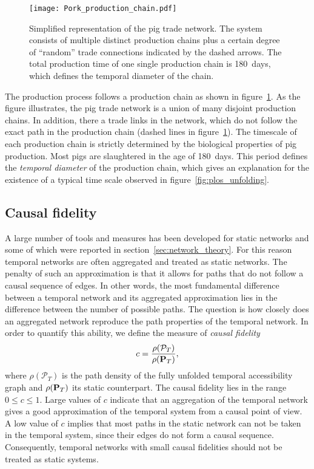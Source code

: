 %
\begin{figure}[htb]
\begin{center}
\texttt{[image: Pork\_production\_chain.pdf]}
\caption{Simplified representation of the pig trade network.
The system consists of multiple distinct production chains plus a certain degree of ``random'' trade connections indicated by the dashed arrows.
The total production time of one single production chain is 180~days, which defines the temporal diameter of the chain.}
\label{fig:pork_production_chain}
\end{center}
\end{figure}
%
The production process follows a production chain as shown in figure~\ref{fig:pork_production_chain}.
As the figure illustrates, the pig trade network is a union of many disjoint production chains.
In addition, there a trade links in the network, which do not follow the exact path in the production chain (dashed lines in figure~\ref{fig:pork_production_chain}).
The timescale of each production chain is strictly determined by the biological properties of pig production.
Most pigs are slaughtered in the age of 180~days.
This period defines the \emph{temporal diameter} of the production chain, which gives an explanation for the existence of a typical time scale observed in figure~\ref{fig:plos_unfolding}.

\subsection{Causal fidelity}\label{sec:causal_fidelity}
A large number of tools and measures has been developed for static networks and some of which were reported in section~\ref{sec:network_theory}.
For this reason temporal networks are often aggregated and treated as static networks.
The penalty of such an approximation is that it allows for paths that do not follow a causal sequence of edges.
In other words, the most fundamental difference between a temporal network and its aggregated approximation lies in the difference between the number of possible paths.
The question is how closely does an aggregated network reproduce the path properties of the temporal network.
In order to quantify this ability, we define the measure of \emph{causal fidelity}
\begin{equation}\label{eq:causal_fidelity}
c=\frac{\rho (\mathcal{P}_T)}{\rho (\mathbf{P}_T)} ,
\end{equation}
where $\rho (\mathcal{P}_T)$ is the path density of the fully unfolded temporal accessibility graph and $\rho (\mathbf{P}_T)$ its static counterpart.
The causal fidelity lies in the range $0\leq c \leq 1$.
Large values of $c$ indicate that an aggregation of the temporal network gives a good approximation of the temporal system from a causal point of view.
A low value of $c$ implies that most paths in the static network can not be taken in the temporal system, since their edges do not form a causal sequence.
Consequently, temporal networks with small causal fidelities should not be treated as static systems.

